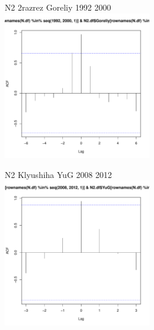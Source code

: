 \documentclass[12pt, a4paper]{disser}
\begin{document}
\begin{figure}[ht]
	\begin{minipage}[b]{.46\linewidth}
	\begin{center}
	{\tiny  N2 2razrez Goreliy 1992 2000}
	\includegraphics[width=65mm]{../White_Sea/dynamic_N_N1/crosscorr_N2_2razrez_Goreliy_1992_2000.pdf}
	\end{center}
	\end{minipage}
%
	\hfil %
%
	\begin{minipage}[b]{.46\linewidth}
	\begin{center}	
	{\tiny    N2 Klyushiha YuG 2008 2012}
	\includegraphics[width=65mm]{../White_Sea/dynamic_N_N1/crosscorr_N2_Klyushiha_YuG_2008_2012.pdf}
	\end{center}
	\end{minipage}



\end{figure}
\end{document}

